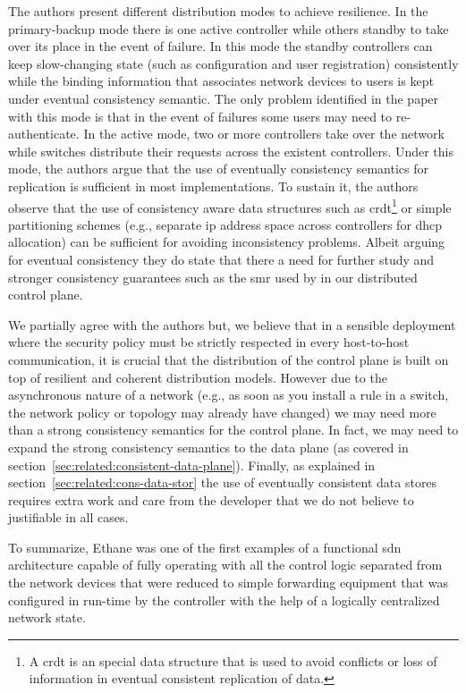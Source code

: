 The authors present different distribution modes to achieve resilience. 
In the primary-backup mode  there is one active controller while others standby to take over its place in the event of failure. 
In this mode the standby controllers can keep slow-changing state (such as configuration and user registration) consistently while the binding information that associates network devices to users is kept under eventual consistency semantic. 
The only problem identified in the paper with this mode is that in the event of failures some users may need to re-authenticate. 
In the active mode, two or more controllers take over the network while switches distribute their requests across the existent controllers.  
Under this mode, the authors argue that  the use of eventually consistency semantics for replication is sufficient in most implementations. To  sustain it, the authors observe that the use of consistency aware data structures such as \gls{crdt}\footnote{A \gls{crdt} is an special data structure that is used to avoid conflicts or loss of information in eventual consistent replication of data.} or simple partitioning schemes (e.g., separate \gls{ip} address space across controllers for \gls{dhcp} allocation) can be sufficient for avoiding inconsistency problems. 
Albeit arguing for eventual consistency they do state that there a need for further study and stronger consistency guarantees such as the \gls{smr} used by in our distributed control plane. 

We partially agree with the authors but, we believe that in a sensible deployment where the security policy must be strictly respected in every host-to-host communication, it is crucial that the distribution of the control plane is built on top of resilient and coherent distribution models. 
However due to the asynchronous nature of a network (e.g., as soon as you install a rule in a switch, the network policy or topology may already have changed) we may need more than a strong consistency semantics for the control plane. In fact, we may need to expand the strong consistency semantics to the data plane (as covered in section~\ref{sec:related:consistent-data-plane}). 
Finally, as explained in section~\ref{sec:related:cons-data-stor} the use of eventually consistent data stores requires extra work and care from the developer that we do not believe to justifiable in all cases. 

To summarize, Ethane was one of the first examples  of a functional \gls{sdn} architecture capable of fully operating with all the control logic separated from the network devices that were reduced to simple forwarding equipment that was configured in run-time by the controller with the help of a logically centralized network state.  

